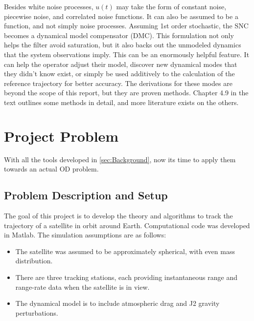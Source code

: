 \documentclass[12pt,a4paper,oneside]{article}
\numberwithin{equation}{section}   		%
\begin{document}
Besides white noise processes, $u(t)$ may take the form of constant noise, piecewise noise, and correlated noise functions. It can also be assumed to be a function, and not simply noise processes. Assuming 1st order stochastic, the SNC becomes a dynamical model compensator (DMC). This formulation not only helps the filter avoid saturation, but it also backs out the unmodeled dynamics that the system observations imply. This can be an enormously helpful feature. It can help the operator adjust their model, discover new dynamical modes that they didn't know exist, or simply be used additively to the calculation of the reference trajectory for better accuracy. The derivations for these modes are beyond the scope of this report, but they are proven methods. Chapter 4.9 in the text outlines some methods in detail, and more literature exists on the others. 






\section{Project Problem}
\label{sec:Project Problem}

With all the tools developed in \ref{sec:Background}, now its time to apply them towards an actual OD problem. 


\subsection{Problem Description and Setup}
\label{sec:Problem Description and Setup}

The goal of this project is to develop the theory and algorithms to track the trajectory of a satellite in orbit around Earth. Computational code was developed in Matlab. The simulation assumptions are as follows:
\begin{itemize}
	\item The satellite was assumed to be approximately spherical, with even mass distribution.
	\item There are three tracking stations, each providing instantaneous range and range-rate data when the satellite is in view. 
	\item The dynamical model is to include atmospheric drag and J2 gravity perturbations.
\end{itemize}
\end{document}
